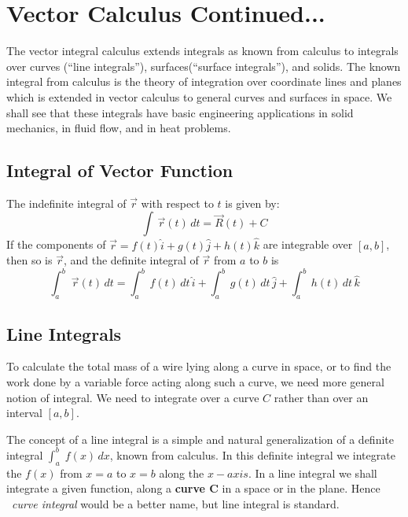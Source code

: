 \documentclass[aima331_lecturenotes_ku.tex]{subfiles}
\begin{document}
\chapter*{Vector Calculus Continued...}

The vector integral calculus extends integrals as known from calculus to integrals over curves (``line integrals''), surfaces(``surface integrals''), and solids. The known integral from calculus is the theory of integration over coordinate lines and planes which is extended in vector calculus to general curves and surfaces in space. We shall see that these integrals have basic engineering applications in solid mechanics, in fluid flow, and in heat problems.

\section{Integral of Vector Function}
The indefinite integral of $\vec{r}$ with respect to $t$ is given by:
$$\int \, \vec{r}(t)\,dt = \vec{R}(t) + C$$
If the components of $\vec{r}=f(t)\hat{i} + g(t)\hat{j}+h(t)\hat{k}$ are integrable over $[a,b]$, then so is $\vec{r}$, and the definite integral of $\vec{r}$ from $a$ to $b$ is
$$\int_{a}^{b} \; \vec{r}(t)\,dt = \int_{a}^{b}\,f(t)\,dt\,\hat{i} + \int_{a}^{b}\,g(t)\,dt\,\hat{j} + \int_{a}^{b}\,h(t)\,dt\,\hat{k}$$

\section{Line Integrals}
To calculate the total mass of a wire lying along a curve in space, or to find the work done by a variable force acting along such a curve, we need more general notion of integral. We need to integrate over a curve $C$ rather than over an interval $[a,b]$.

The concept of a line integral is a simple and natural generalization of a definite integral $\displaystyle \int_a^b \; f(x)\, dx$, known from calculus. In this definite integral we integrate the $f(x)$ from $x=a$ to $x=b$ along the $x-axis$. In a line integral we shall integrate a given function, along a \textbf{curve C} in a space or in the plane. Hence \
\textit{curve integral} would be a better name, but line integral is standard. \\
\end{document}
